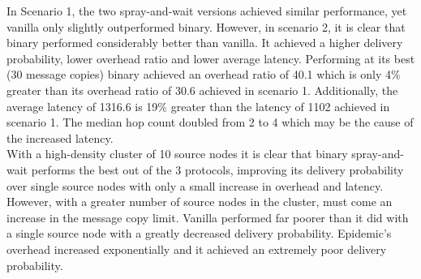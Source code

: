 \documentclass{article}
\begin{document}
\newline In Scenario 1, the two spray-and-wait versions achieved similar performance, yet vanilla only slightly outperformed binary. However, in scenario 2, it is clear that binary performed considerably better than vanilla. It achieved a higher delivery probability, lower overhead ratio and lower average latency. Performing at its best (30 message copies) binary achieved an overhead ratio of 40.1 which is only 4\% greater than its overhead ratio of 30.6 achieved in scenario 1. Additionally, the average latency of 1316.6 is 19\% greater than the latency of 1102 achieved in scenario 1. The median hop count doubled from 2 to 4 which may be the cause of the increased latency.\\
\newline With a high-density cluster of 10 source nodes it is clear that binary spray-and-wait performs the best out of the 3 protocols, improving its delivery probability over single source nodes with only a small increase in overhead and latency. However, with a greater number of source nodes in the cluster, must come an increase in the message copy limit. Vanilla performed far poorer than it did with a single source node with a greatly decreased delivery probability. Epidemic's overhead increased exponentially and it achieved an extremely poor delivery probability.

\end{document}
